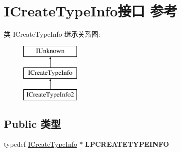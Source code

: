 \hypertarget{interface_i_create_type_info}{}\section{I\+Create\+Type\+Info接口 参考}
\label{interface_i_create_type_info}
类 I\+Create\+Type\+Info 继承关系图\+:\begin{figure}[H]
\begin{center}
\leavevmode
\includegraphics[height=3.000000cm]{interface_i_create_type_info}
\end{center}
\end{figure}
\subsection*{Public 类型}
\begin{DoxyCompactItemize}
\item 
\mbox{\label{interface_i_create_type_info_a7d3fe3417dccf5eb206bee7b587c1beb}} 
typedef \hyperlink{interface_i_create_type_info}{I\+Create\+Type\+Info} $\ast$ {\bfseries L\+P\+C\+R\+E\+A\+T\+E\+T\+Y\+P\+E\+I\+N\+FO}
\end{DoxyCompactItemize}
